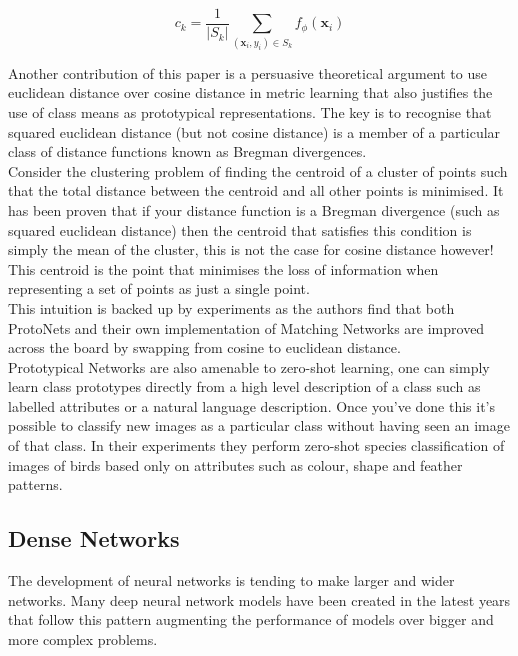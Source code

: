 \documentclass[runningheads,a4paper]{llncs}
\begin{document}
\begin{equation}
    c_k = \frac{1}{|S_k|} \sum_{(\mathbf{x}_i, y_i) \in S_k} f_{\phi}(\mathbf{x}_i)
\end{equation}

Another contribution of this paper is a persuasive theoretical argument to use euclidean distance over cosine distance in metric learning that also justifies the use of class means as prototypical representations. The key is to recognise that squared euclidean distance (but not cosine distance) is a member of a particular class of distance functions known as Bregman divergences. \\

Consider the clustering problem of finding the centroid of a cluster of points such that the total distance between the centroid and all other points is minimised. It has been proven that if your distance function is a Bregman divergence (such as squared euclidean distance) then the centroid that satisfies this condition is simply the mean of the cluster, this is not the case for cosine distance however! This centroid is the point that minimises the loss of information when representing a set of points as just a single point. \\

This intuition is backed up by experiments as the authors find that both ProtoNets and their own implementation of Matching Networks are improved across the board by swapping from cosine to euclidean distance. \\

Prototypical Networks are also amenable to zero-shot learning, one can simply learn class prototypes directly from a high level description of a class such as labelled attributes or a natural language description. Once you’ve done this it’s possible to classify new images as a particular class without having seen an image of that class. In their experiments they perform zero-shot species classification of images of birds based only on attributes such as colour, shape and feather patterns.

\subsection{Dense Networks}

The development of neural networks is tending to make larger and wider networks. Many deep neural network models have been created in the latest years that follow this pattern augmenting the performance of models over bigger and more complex problems. \\
\end{document}
